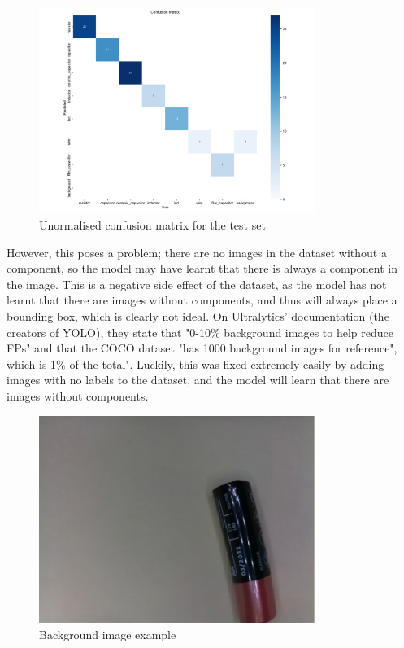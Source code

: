 \begin{figure}[H]
    \centering
    \includegraphics[width=0.8\textwidth]{imgs/graphs/unconfusion_matrix_test.png}
    \caption{Unormalised confusion matrix for the test set}
    \label{fig:unconfusion-matrix}
  \end{figure}

However, this poses a problem; there are no images in the dataset without a component, so the model may have learnt that there is always a component in the image. This is a negative side effect of the dataset, as the model has not learnt that there are images without components, and thus will always place a bounding box, which is clearly not ideal. On Ultralytics' documentation \cite{ultralytics_2023} (the creators of YOLO), they state that "0-10\% background images to help reduce FPs" and that the COCO dataset "has 1000 background images for reference", which is 1\% of the total". Luckily, this was fixed extremely easily by adding images with no labels to the dataset, and the model will learn that there are images without components.

\begin{figure}[H]
    \centering
    \includegraphics[width=0.8\textwidth]{imgs/cv/obb_background_1.png}
    \caption{Background image example}
    \label{fig:bg-image}
  \end{figure}
  
